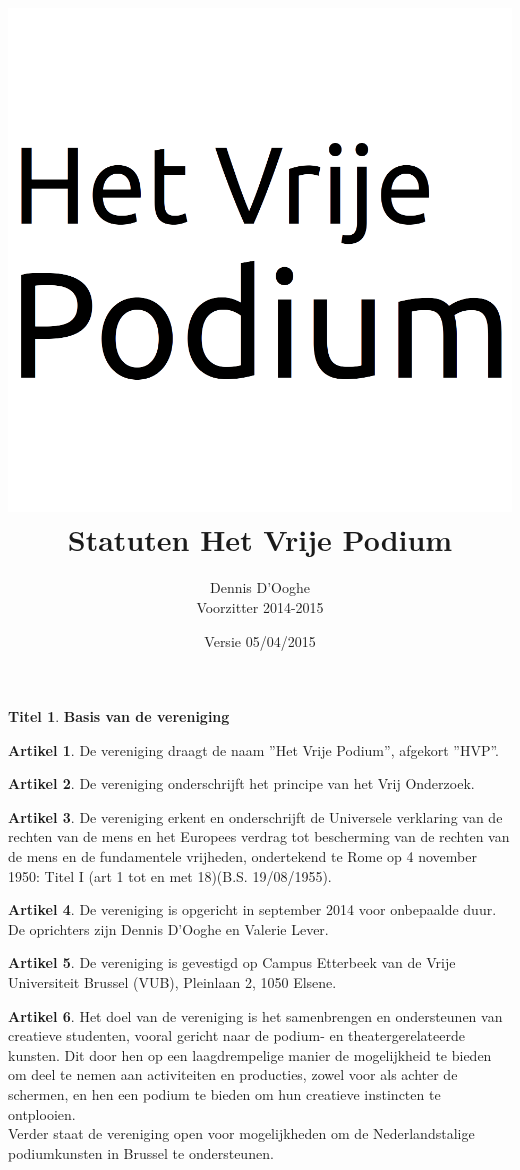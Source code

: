 \documentclass[a4paper,10pt]{article}
\title{\vspace{-2.0cm}\includegraphics[scale=0.3]{img/logo.png}\\
  \vspace{1cm}Statuten Het Vrije Podium}
\author{Dennis D'Ooghe\\Voorzitter 2014-2015}
\date{Versie 05/04/2015} %
\theoremstyle{definition}
\newtheorem{titel}{\newline\Large Titel}
\newtheorem{artikelbase}{\large Artikel}
\newenvironment{artikel}
  {\begin{artikelbase}}
  {\smallskip
   \end{artikelbase}}
\newcommand{\ttext}[1]{\Large \textbf{#1} \normalsize}
\newcommand{\ttextcr}{\hfill\newline}
\begin{document}
\maketitle

\begin{versionhistory}
\end{versionhistory}

\newpage


\begin{titel}\ttext{Basis van de vereniging}

  \begin{artikel}\ttextcr
    De vereniging draagt de naam ''Het Vrije Podium'', afgekort ''HVP''.
  \end{artikel}

  \begin{artikel}\ttextcr
    De vereniging onderschrijft het principe van het Vrij Onderzoek.
  \end{artikel}

  \begin{artikel}\ttextcr
    De vereniging erkent en onderschrijft de Universele verklaring van de rechten van de mens en het Europees verdrag tot bescherming van de rechten van de mens en de fundamentele vrijheden, ondertekend te Rome op 4 november 1950: Titel I (art 1 tot en met 18)(B.S. 19/08/1955).
  \end{artikel}

  \begin{artikel}\label{kring-oprichting}\ttextcr
    De vereniging is opgericht in september 2014 voor onbepaalde duur.
    De oprichters zijn Dennis D'Ooghe en Valerie Lever.
  \end{artikel}

  \begin{artikel}\ttextcr
    De vereniging is gevestigd op Campus Etterbeek van de Vrije Universiteit Brussel (VUB), Pleinlaan 2, 1050 Elsene.
  \end{artikel}

  \begin{artikel}\ttextcr
    Het doel van de vereniging is het samenbrengen en ondersteunen van creatieve studenten, vooral gericht naar de podium- en theatergerelateerde kunsten.
    Dit door hen op een laagdrempelige manier de mogelijkheid te bieden om deel te nemen aan activiteiten en producties, zowel voor als achter de schermen, en hen een podium te bieden om hun creatieve instincten te ontplooien.\\
    Verder staat de vereniging open voor mogelijkheden om de Nederlandstalige podiumkunsten in Brussel te ondersteunen.
  \end{artikel}


\end{titel}
\end{document}
